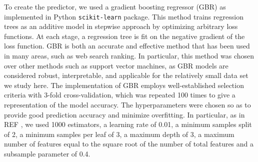 \documentclass[journal=jacsat,manuscript=article]{achemso}
\begin{document}
To create the predictor, we used a gradient boosting regressor (GBR)\cite{Friedman2001,Hastie2009} as implemented in Python \texttt{scikit-learn} package. This method trains regression trees as an additive model in stepwise approach by optimizing arbitrary loss functions. At each stage, a regression tree is fit on the negative gradient of the loss function. GBR is both an accurate and effective method that has been used in many areas, such as web search ranking.\cite{Mohan2011} In particular, this method was chosen over other methods such as support vector machines,\cite{Li2009} as GBR models are considered robust, interpretable, and applicable for the relatively small data set we study here.\cite{Caruana2006} The implementation of GBR employs well-established selection criteria with 3-fold cross-validation, which was repeated 100 times to give a representation of the model accuracy. The hyperparameters were chosen so as to provide good prediction accuracy and minimize overfitting. In particular, as in REF , we used 1000 estimators, a learning rate of 0.01, a minimum samples split of 2, a minimum samples per leaf of 3, a maximum depth of 3, a maximum number of features equal to the square root of the number of total features and a subsample parameter of 0.4.
\end{document}
